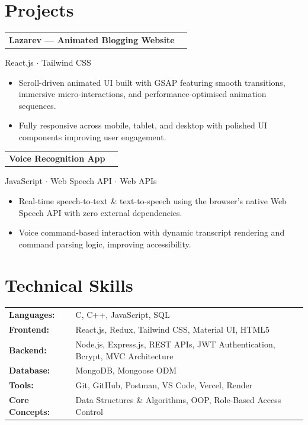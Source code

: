 \documentclass[10.5pt,a4paper]{article}
\makeatletter
\newcommand{\entry}[2]{%
  \vspace{3pt}
  \noindent
  \begin{tabularx}{\linewidth}{@{}X r@{}}
    \textbf{\color{darktext} #1} & \textit{\color{graytext}\small #2} \\
  \end{tabularx}
}
\newcommand{\subentry}[1]{%
  {\itshape\color{graytext}\small #1}\par\vspace{2pt}
}
\makeatother
\begin{document}
\section*{Projects}

\entry{Lazarev --- Animated Blogging Website}
\subentry{React.js  $\cdot$ Tailwind CSS}
\begin{itemize}
    \item Scroll-driven animated UI built with GSAP featuring smooth transitions, immersive micro-interactions, and performance-optimised animation sequences.
    \item Fully responsive across mobile, tablet, and desktop with polished UI components improving user engagement.
\end{itemize}

\entry{Voice Recognition App}
\subentry{JavaScript $\cdot$ Web Speech API $\cdot$ Web APIs}
\begin{itemize}
    \item Real-time speech-to-text \& text-to-speech using the browser's native Web Speech API with zero external dependencies.
    \item Voice command-based interaction with dynamic transcript rendering and command parsing logic, improving accessibility.
\end{itemize}

\section*{Technical Skills}

\begin{tabularx}{\linewidth}{@{}l X@{}}
\textbf{Languages:} & C, C++, JavaScript, SQL \\[2pt]
\textbf{Frontend:} & React.js, Redux, Tailwind CSS, Material UI, HTML5 \\[2pt]
\textbf{Backend:} & Node.js, Express.js, REST APIs, JWT Authentication, Bcrypt, MVC Architecture \\[2pt]
\textbf{Database:} & MongoDB, Mongoose ODM \\[2pt]
\textbf{Tools:} & Git, GitHub, Postman, VS Code, Vercel, Render \\[2pt]
\textbf{Core Concepts:} & Data Structures \& Algorithms, OOP, Role-Based Access Control \\
\end{tabularx}

\end{document}
